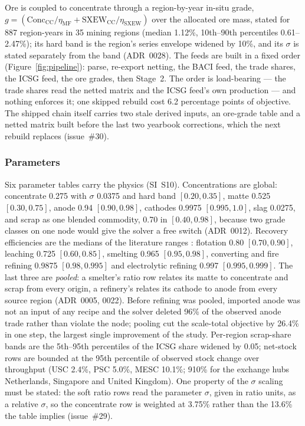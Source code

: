 Ore is coupled to concentrate through a region-by-year in-situ grade, $g =
(\mathrm{Conc}_{\mathrm{CC}}/\eta_{\mathrm{MF}} +
\mathrm{SXEW}_{\mathrm{CC}}/\eta_{\mathrm{SXEW}})$ over the allocated ore
mass, stated for 887 region-years in 35 mining regions (median 1.12\%,
10th--90th percentiles 0.61--2.47\%); its hard band is the region's series
envelope widened by 10\%, and its $\sigma$ is stated separately from the
band (ADR~0028). The feeds are built in a fixed order
(Figure~\ref{fig:pipeline}): parse, re-export netting, the BACI feed, the
trade shares, the ICSG feed, the ore grades, then Stage~2. The order is
load-bearing --- the trade shares read the netted matrix and the ICSG feed's
own production --- and nothing enforces it; one skipped rebuild cost 6.2
percentage points of objective. The shipped chain itself carries two stale
derived inputs, an ore-grade table and a netted matrix built before the last
two yearbook corrections, which the next rebuild replaces (issue~\#30).

\subsubsection{Parameters}\label{sec:params}

Six parameter tables carry the physics (SI~S10). Concentrations are global:
concentrate 0.275 with $\sigma$ 0.0375 and hard band $[0.20, 0.35]$, matte
0.525 $[0.30, 0.75]$, anode 0.94 $[0.90, 0.98]$, cathodes 0.9975
$[0.995, 1.0]$, slag 0.0275, and scrap as one blended commodity, 0.70 in
$[0.40, 0.98]$, because two grade classes on one node would give the solver
a free switch (ADR~0012). Recovery efficiencies are the medians of the
literature ranges \citep{schlesinger2022extractive,
davenport2002extractive}: flotation 0.80 $[0.70, 0.90]$, leaching 0.725
$[0.60, 0.85]$, smelting 0.965 $[0.95, 0.98]$, converting and fire refining
0.9875 $[0.98, 0.995]$ and electrolytic refining 0.997 $[0.995, 0.999]$. The
last three are \emph{pooled}: a smelter's ratio row relates its matte to
concentrate and scrap from every origin, a refinery's relates its cathode to
anode from every source region (ADR~0005, 0022). Before refining was pooled,
imported anode was not an input of any recipe and the solver deleted 96\% of
the observed anode trade rather than violate the node; pooling cut the
scale-total objective by 26.4\% in one step, the largest single improvement
of the study. Per-region scrap-share bands are the 5th--95th percentiles of
the ICSG share widened by 0.05; net-stock rows are bounded at the 95th
percentile of observed stock change over throughput (USC 2.4\%, PSC 5.0\%,
MESC 10.1\%; 910\% for the exchange hubs Netherlands, Singapore and United
Kingdom). One property of the $\sigma$ scaling must be stated: the soft
ratio rows read the parameter $\sigma$, given in ratio units, as a relative
$\sigma$, so the concentrate row is weighted at 3.75\% rather than the
13.6\% the table implies (issue~\#29).

